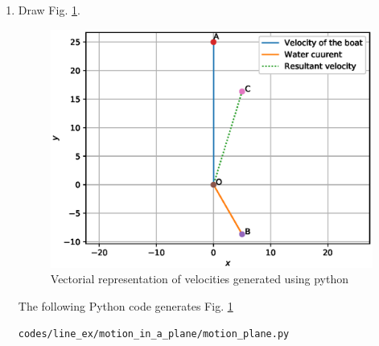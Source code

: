 \renewcommand{\theequation}{\theenumi}
\begin{enumerate}

\item Draw Fig. \ref{fig:motion_plane_motion_in_a_plane}.

\begin{figure}[!ht]
\centering
\includegraphics[width=\columnwidth]{./figs/line_ex/motion_in_a_plane/motion_plane.eps}
\caption{Vectorial representation of velocities generated using python}
\label{fig:motion_plane_motion_in_a_plane}
\end{figure} 

\solution The  following Python code generates Fig. \ref{fig:motion_plane_motion_in_a_plane}

\begin{lstlisting}
codes/line_ex/motion_in_a_plane/motion_plane.py
\end{lstlisting}
\end{enumerate}

